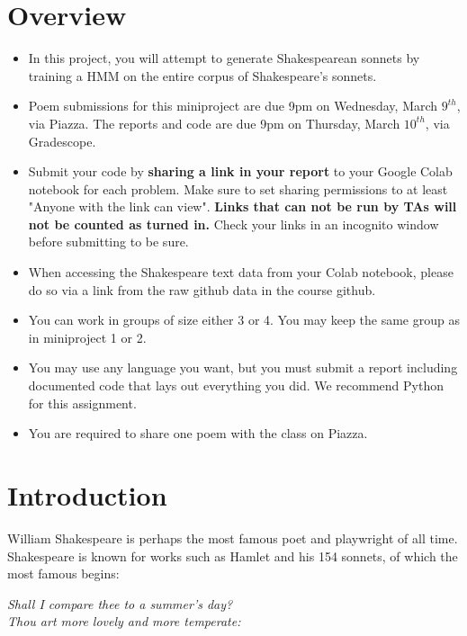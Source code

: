 



\pagestyle{fancy}
\section{Overview}
\begin{itemize}
\item In this project, you will attempt to generate Shakespearean sonnets by training a HMM on the entire corpus of Shakespeare's sonnets.

\item Poem submissions for this miniproject are due 9pm on Wednesday, March $9^{th}$, via Piazza. The reports and code are due 9pm on Thursday, March $10^{th}$, via Gradescope.

\item Submit your code by \textbf{sharing a link in your report} to your Google Colab notebook for each problem. Make sure to set sharing permissions to at least "Anyone with the link can view". \textbf{Links that can not be run by TAs will not be counted as turned in.} Check your links in an incognito window before submitting to be sure.

\item When accessing the Shakespeare text data from your Colab notebook, please do so via a link from the raw github data in the course github.

\item You can work in groups of size either 3 or 4.  You may keep the same group as in miniproject 1 or 2.

\item You may use any language you want, but you must submit a report including documented code that lays out everything you did. We recommend Python for this assignment.

\item You are required to share one poem with the class on Piazza.

\end{itemize}

\section{Introduction}
William Shakespeare is perhaps the most famous poet and playwright of all time. Shakespeare is known for works such as Hamlet and his 154 sonnets, of which the most famous begins:
\begin{center}\emph{Shall I compare thee to a summer's day?\\
Thou art more lovely and more temperate:}\end{center}

